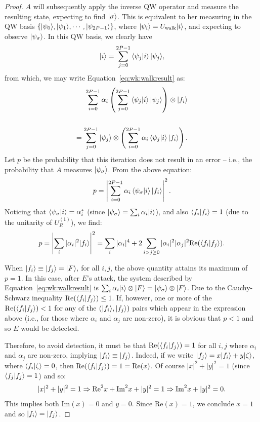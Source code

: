 \begin{proof}
$A$ will subsequently apply the inverse QW operator and measure the resulting state, expecting to find $| \sigma \rangle$.  This is equivalent to her measuring in the QW basis $\{| \psi_0 \rangle, | \psi_1 \rangle, \cdots, | \psi_{2P-1} \rangle\}$, where $| \psi_i \rangle = U_{\text{walk}}| i \rangle$, and expecting to observe $| \psi_\sigma \rangle$.  In this QW basis, we clearly have
\[
| i \rangle = \sum_{j=0}^{2P-1}\braket{\psi_j|i}| \psi_j \rangle,
\]
from which, we may write Equation~\eqref{eq:wk:walkresult} as:
\begin{eqnarray}
\sum_{i=0}^{2P-1}\alpha_i \left( \sum_{j=0}^{2P-1}\braket{\psi_j|i}| \psi_j \rangle\right) \otimes | f_i \rangle\\\\
=\sum_{j=0}^{2P-1}| \psi_j \rangle\otimes\left(\sum_{i=0}^{2P-1}\alpha_i\braket{\psi_j|i}| f_i \rangle\right).
\end{eqnarray}
Let $p$ be the probability that this iteration does not result in an error -- i.e., the probability that $A$ measures $| \psi_\sigma \rangle$. From the above equation:
\[
p = \left| \sum_{i=0}^{2P-1}\alpha_i\braket{\psi_\sigma|i}| f_i \rangle \right|^2.
\]
Noticing that $\braket{\psi_\sigma|i} = \alpha_i^*$ (since $| \psi_\sigma \rangle = \sum_i\alpha_i| i \rangle$), and also $\braket{f_i|f_i} = 1$ (due to the unitarity of $U_R^{(1)}$), we find:
\[
p = \left|\sum_i|\alpha_i|^2| f_i \rangle\right|^2 = \sum_i|\alpha_i|^4 + 2\sum_{i>j\ge 0}|\alpha_i|^2|\alpha_j|^2\text{Re}(\braket{f_i|f_j}).
\]

When $| f_i \rangle \equiv | f_j \rangle=| F \rangle,$ for all $i,j$, the above quantity attains its maximum of $p=1$. In this case, after $E$'s attack, the system described by Equation~\eqref{eq:wk:walkresult} is $\sum_i\alpha_i| i \rangle\otimes| F \rangle = | \psi_\sigma \rangle\otimes| F \rangle$.  Due to the Cauchy-Schwarz inequality $\text{Re}(\braket{f_i|f_j}) \le 1$.  If, however, one or more of the $\text{Re}(\braket{f_i|f_j}) < 1$ for any of the $(| f_i \rangle, | f_j \rangle)$ pairs which appear in the expression above (i.e., for those where $\alpha_i$ and $\alpha_j$ are non-zero), it is obvious that $p < 1$ and so $E$ would be detected.

Therefore, to avoid detection, it must be that $\text{Re}(\braket{f_i|f_j}) = 1$ for all $i,j$ where $\alpha_i$ and $\alpha_j$ are non-zero, implying $| f_i \rangle \equiv | f_j \rangle$.  Indeed, if we write $| f_j \rangle = x| f_i \rangle + y| \zeta \rangle$, where $\braket{f_i|\zeta} = 0$, then $\text{Re}(\braket{f_i|f_j}) = 1 = \text{Re} (x)$.  Of course $|x|^2 + |y|^2 = 1$ (since $\braket{f_j|f_j} = 1$) and so:
\begin{equation*}
|x|^2+|y|^2 = 1\\
\Rightarrow \text{Re}^2 x + \text{Im}^2 x + |y|^2 = 1\\
\Rightarrow \text{Im}^2x + |y|^2 = 0.
\end{equation*}
This implies both $\text{Im}(x) = 0$ and $y=0$.  Since $\text{Re}(x) = 1$, we conclude $x=1$ and so $| f_i \rangle = | f_j \rangle$.


\end{proof}
